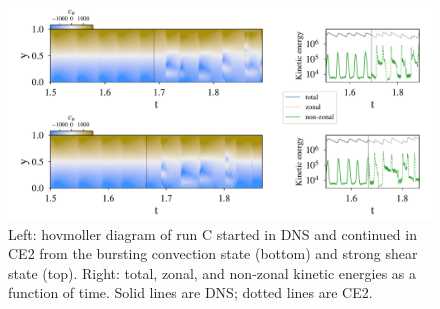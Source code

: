 \documentclass{jfm}
\begin{document}
\begin{figure}
  \centering
  \includegraphics[width=\textwidth]{../../figs/run_C_fig.pdf}
  \caption{Left: hovmoller diagram of run C started in DNS and continued in CE2 from the bursting convection state (bottom) and strong shear state (top). Right: total, zonal, and non-zonal kinetic energies as a function of time. Solid lines are DNS; dotted lines are CE2.}
  \label{fig:run_C}
\end{figure}
\end{document}
